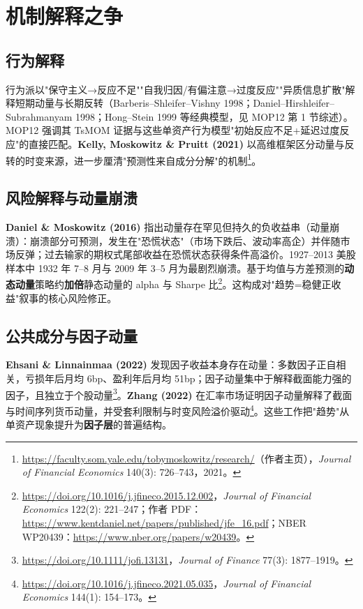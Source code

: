 \documentclass[11pt,a4paper]{article}
\begin{document}
\section{机制解释之争}
\subsection{行为解释}
行为派以"保守主义→反应不足""自我归因/有偏注意→过度反应""异质信息扩散"解释短期动量与长期反转（Barberis--Shleifer--Vishny 1998；Daniel--Hirshleifer--Subrahmanyam 1998；Hong--Stein 1999 等经典模型，见 MOP12 第 1 节综述）。MOP12 强调其 TsMOM 证据与这些单资产行为模型"初始反应不足+延迟过度反应"的直接匹配。\textbf{Kelly, Moskowitz \& Pruitt (2021)} 以高维框架区分动量与反转的时变来源，进一步厘清"预测性来自成分分解"的机制\footnote{\url{https://faculty.som.yale.edu/tobymoskowitz/research/}（作者主页），\emph{Journal of Financial Economics} 140(3): 726--743，2021。}。

\subsection{风险解释与动量崩溃}
\textbf{Daniel \& Moskowitz (2016)} 指出动量存在罕见但持久的负收益串（动量崩溃）：崩溃部分可预测，发生在"恐慌状态"（市场下跌后、波动率高企）并伴随市场反弹；过去输家的期权式尾部收益在恐慌状态获得条件高溢价。1927--2013 美股样本中 1932 年 7--8 月与 2009 年 3--5 月为最剧烈崩溃。基于均值与方差预测的\textbf{动态动量}策略约\textbf{加倍}静态动量的 alpha 与 Sharpe 比\footnote{\url{https://doi.org/10.1016/j.jfineco.2015.12.002}，\emph{Journal of Financial Economics} 122(2): 221--247；作者 PDF：\url{https://www.kentdaniel.net/papers/published/jfe_16.pdf}；NBER WP20439：\url{https://www.nber.org/papers/w20439}。}。这构成对"趋势=稳健正收益"叙事的核心风险修正。

\subsection{公共成分与因子动量}
\textbf{Ehsani \& Linnainmaa (2022)} 发现因子收益本身存在动量：多数因子正自相关，亏损年后月均 6bp、盈利年后月均 51bp；因子动量集中于解释截面能力强的因子，且独立于个股动量\footnote{\url{https://doi.org/10.1111/jofi.13131}，\emph{Journal of Finance} 77(3): 1877--1919。}。\textbf{Zhang (2022)} 在汇率市场证明因子动量解释了截面与时间序列货币动量，并受套利限制与时变风险溢价驱动\footnote{\url{https://doi.org/10.1016/j.jfineco.2021.05.035}，\emph{Journal of Financial Economics} 144(1): 154--173。}。这些工作把"趋势"从单资产现象提升为\textbf{因子层}的普遍结构。
\end{document}
